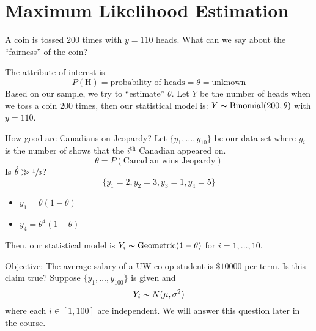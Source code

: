 \section{Maximum Likelihood Estimation}

\begin{exbox}
    \begin{example}
        A coin is tossed $ 200 $ times with $ y=110 $ heads. What can we say
        about the ``fairness'' of the coin?

        The attribute of interest is
        \[ P(\text{H})=\text{probability of heads}=\theta=\text{unknown} \]
        Based on our sample, we try to ``estimate'' $ \theta $.
        Let $ Y $ be the number of heads when we toss a coin $ 200 $ times,
        then our statistical model is: $ Y \thicksim \operatorname{Binomial}(200,\theta) $
        with $ y=110 $.
    \end{example}
\end{exbox}

\begin{exbox}
    \begin{example}
        How good are Canadians on Jeopardy? Let $ \{y_1,\ldots ,y_{10}\} $
        be our data set where $ y_i $ is the number of shows that the
        $ i^{\text{th}} $ Canadian appeared on.
        \[ \theta=P(\text{Canadian wins Jeopardy}) \]
        Is $ \hat{\theta}\gg\sfrac{1}{3} $?
        \[ \{y_1=2,y_2=3,y_3=1,y_4=5\} \]
        \begin{itemize}
            \item $ y_1=\theta(1-\theta) $
            \item $ y_4=\theta^4(1-\theta) $
        \end{itemize}
        Then, our statistical model is $ Y_i \thicksim \operatorname{Geometric}(1-\theta) $
        for $ i=1,\ldots ,10 $.
    \end{example}
\end{exbox}
\underline{Objective}: The average salary of a UW co-op student is $ \$10000 $ per term.
Is this claim true? Suppose $ \{y_1,\ldots ,y_{100}\} $ is given and
\[ Y_i \thicksim N(\mu,\sigma^2) \]
where each $ i\in[1,100] $ are independent. We will answer this question later in the course.
